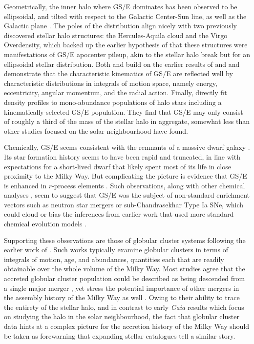 Geometrically, the inner halo where GS/E dominates has been observed to be ellipsoidal, and tilted with respect to the Galactic Center-Sun line, as well as the Galactic plane \parencite{iorio19}. The poles of the distribution align nicely with two previously discovered stellar halo structures: the Hercules-Aquila cloud and the Virgo Overdensity, which backed up the earlier hypothesis of \textcite{simion19} that these structures were manifestations of GS/E apocenter pileup, akin to the stellar halo break but for an ellipsoidal stellar distribution. Both \textcite{koppelman18} and \textcite{feuillet20} build on the earlier results of \textcite{helmi18} and \textcite{myeong18} and demonstrate that the characteristic kinematics of GS/E are reflected well by characteristic distributions in integrals of motion space, namely energy, eccentricity, angular momentum, and the radial action. Finally, \textcite{mackereth20} directly fit density profiles to mono-abundance populations of halo stars including a kinematically-selected GS/E population. They find that GS/E may only consist of roughly a third of the mass of the stellar halo in aggregate, somewhat less than other studies focused on the solar neighbourhood have found.

Chemically, GS/E seems consistent with the remnants of a massive dwarf galaxy \parencite{fernandezalvar18,vincenzo19,monty20,hasselquist21}. Its star formation history seems to have been rapid and truncated, in line with expectations for a short-lived dwarf that likely spent most of its life in close proximity to the Milky Way. But complicating the picture is evidence that GS/E is enhanced in $r$-process elements \parencite{aguado21,matsuno21}. Such observations, along with other chemical analyses \parencite{sanders21}, seem to suggest that GS/E was the subject of non-standard enrichment vectors such as neutron star mergers or sub-Chandrasekhar Type Ia SNe, which could cloud or bias the inferences from earlier work that used more standard chemical evolution models \parencite[on which basis][ argues against a rapid and truncated chemical enrichment]{sanders21}. 

Supporting these observations are those of globular cluster systems following the earlier work of \textcite{myeong18}. Such works typically examine globular clusters in terms of integrals of motion, age, and abundances, quantities each that are readily obtainable over the whole volume of the Milky Way. Most studies agree that the accreted globular cluster population could be described as being descended from a single major merger \parencite{massari19}, yet stress the potential importance of other mergers in the assembly history of the Milky Way as well \parencite{myeong19,kruijssen19b,forbes20}. Owing to their ability to trace the entirety of the stellar halo, and in contrast to early \textit{Gaia} results which focus on studying the halo in the solar neighbourhood, the fact that globular cluster data hints at a complex picture for the accretion history of the Milky Way should be taken as forewarning that expanding stellar catalogues tell a similar story.

